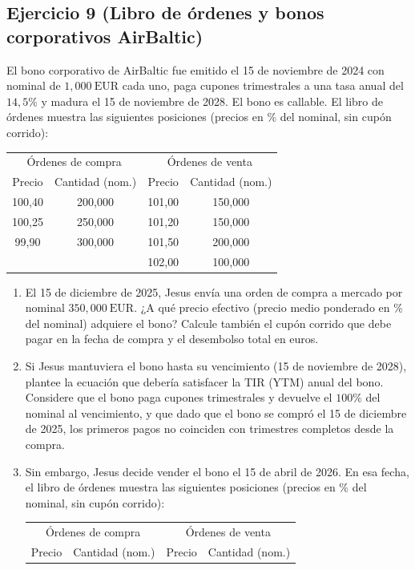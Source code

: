 \documentclass[12pt,a4paper]{article}
\newcommand{\EUR}[1]{\ensuremath{#1~\text{EUR}}}
\newenvironment{ejercicio}[1]{\subsection*{Ejercicio #1}}{}
\begin{document}
\begin{ejercicio}{9 (Libro de órdenes y bonos corporativos AirBaltic)}
El bono corporativo de AirBaltic fue emitido el 15 de noviembre de 2024 con nominal de \EUR{1{,}000} cada uno, paga cupones trimestrales a una tasa anual del \(14{,}5\%\) y madura el 15 de noviembre de 2028. El bono es callable. El libro de órdenes muestra las siguientes posiciones (precios en \% del nominal, sin cupón corrido):
\begin{center}
\begin{tabular}{cc|cc}
\toprule
\multicolumn{2}{c|}{Órdenes de compra} & \multicolumn{2}{c}{Órdenes de venta} \\
Precio & Cantidad (nom.) & Precio & Cantidad (nom.)\\
\midrule
100{,}40 & 200{,}000 & 101{,}00 & 150{,}000\\
100{,}25 & 250{,}000 & 101{,}20 & 150{,}000\\
99{,}90  & 300{,}000 & 101{,}50 & 200{,}000\\
         &           & 102{,}00 & 100{,}000\\
\bottomrule
\end{tabular}
\end{center}
\begin{enumerate}[label=\alph*)]
  \item El 15 de diciembre de 2025, Jesus envía una orden de compra a mercado por nominal \EUR{350{,}000}. ¿A qué precio efectivo (precio medio ponderado en \% del nominal) adquiere el bono? Calcule también el cupón corrido que debe pagar en la fecha de compra y el desembolso total en euros.
  \item Si Jesus mantuviera el bono hasta su vencimiento (15 de noviembre de 2028), plantee la ecuación que debería satisfacer la TIR (YTM) anual del bono. Considere que el bono paga cupones trimestrales y devuelve el \(100\%\) del nominal al vencimiento, y que dado que el bono se compró el 15 de diciembre de 2025, los primeros pagos no coinciden con trimestres completos desde la compra.
  \item Sin embargo, Jesus decide vender el bono el 15 de abril de 2026. En esa fecha, el libro de órdenes muestra las siguientes posiciones (precios en \% del nominal, sin cupón corrido):
  \begin{center}
  \begin{tabular}{cc|cc}
  \toprule
  \multicolumn{2}{c|}{Órdenes de compra} & \multicolumn{2}{c}{Órdenes de venta} \\
  Precio & Cantidad (nom.) & Precio & Cantidad (nom.)\\

\end{tabular}
\end{center}
\end{enumerate}
\end{ejercicio}
\end{document}
